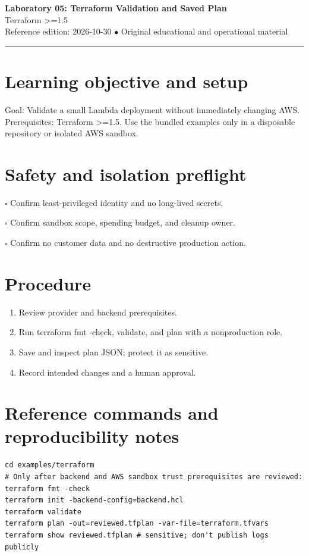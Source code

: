 \documentclass[10pt,letterpaper]{article}
\begin{document}
\begin{center}
{\LARGE\bfseries\color{cdblue}Laboratory 05: Terraform Validation and Saved Plan}\\[7pt]
{\large Terraform >=1.5}\\[6pt]
{\small Reference edition: 2026-10-30 $\bullet$ Original educational and operational material}
\end{center}
\noindent\color{cdblue}\rule{\linewidth}{1.2pt}\color{black}
\vspace{0.4em}
\section{Learning objective and setup}
Goal: Validate a small Lambda deployment without immediately changing AWS. Prerequisites: Terraform >=1.5. Use the bundled examples only in a disposable repository or isolated AWS sandbox.


\section{Safety and isolation preflight}
\noindent $\square$ Confirm least-privileged identity and no long-lived secrets.\par\vspace{0.35em}
\noindent $\square$ Confirm sandbox scope, spending budget, and cleanup owner.\par\vspace{0.35em}
\noindent $\square$ Confirm no customer data and no destructive production action.\par\vspace{0.35em}

\section{Procedure}
\begin{enumerate}
\item Review provider and backend prerequisites.
\item Run terraform fmt -check, validate, and plan with a nonproduction role.
\item Save and inspect plan JSON; protect it as sensitive.
\item Record intended changes and a human approval.
\end{enumerate}

\section{Reference commands and reproducibility notes}
\begin{verbatim}
cd examples/terraform
# Only after backend and AWS sandbox trust prerequisites are reviewed:
terraform fmt -check
terraform init -backend-config=backend.hcl
terraform validate
terraform plan -out=reviewed.tfplan -var-file=terraform.tfvars
terraform show reviewed.tfplan # sensitive; don't publish logs publicly
\end{verbatim}
\end{document}
